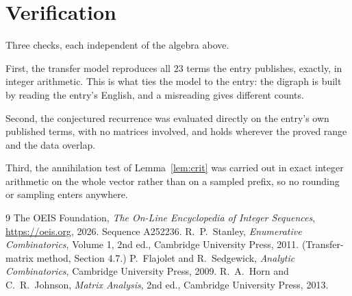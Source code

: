 \documentclass[11pt,a4paper]{article}
\theoremstyle{plain}
\theoremstyle{definition}
\begin{document}
\section{Verification}

Three checks, each independent of the algebra above.

First, the transfer model reproduces all $23$ terms the entry publishes, exactly, in
integer arithmetic. This is what ties the model to the entry: the digraph is built by reading
the entry's English, and a misreading gives different counts.

Second, the conjectured recurrence was evaluated directly on the entry's own published terms,
with no matrices involved, and holds wherever the proved range and the data overlap.

Third, the annihilation test of Lemma~\ref{lem:crit} was carried out in exact integer
arithmetic on the whole vector rather than on a sampled prefix, so no rounding or sampling
enters anywhere.

\begin{thebibliography}{9}
 The OEIS Foundation, \emph{The On-Line Encyclopedia of Integer
Sequences}, \url{https://oeis.org}, 2026. Sequence A252236.
 R.~P.~Stanley, \emph{Enumerative Combinatorics}, Volume 1, 2nd ed.,
Cambridge University Press, 2011. (Transfer-matrix method, Section 4.7.)
 P.~Flajolet and R.~Sedgewick, \emph{Analytic Combinatorics}, Cambridge
University Press, 2009.
 R.~A.~Horn and C.~R.~Johnson, \emph{Matrix Analysis}, 2nd ed., Cambridge
University Press, 2013.
\end{thebibliography}
\end{document}
